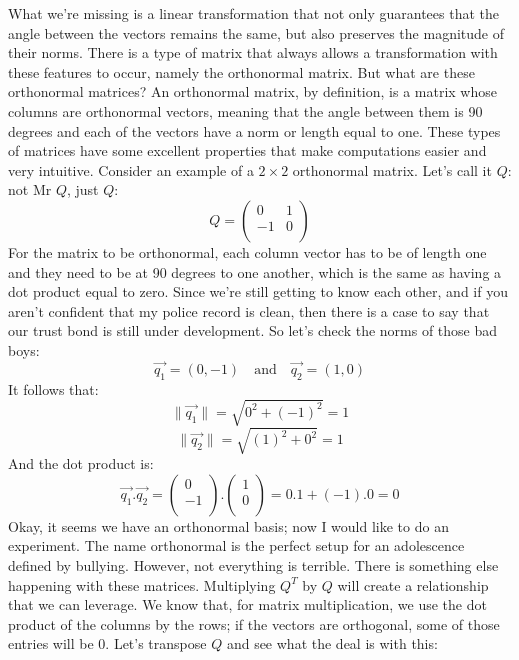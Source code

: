 \documentclass[600paper, 11pt,twoside,openany]{kdp}
\begin{document}
What we’re missing is a linear transformation that not only guarantees that the angle between the vectors remains the same, but also preserves the magnitude of their norms. There is a type of matrix that always allows a transformation with these features to occur, namely the orthonormal matrix. But what are these orthonormal matrices? An orthonormal matrix, by definition, is a matrix whose columns are orthonormal vectors, meaning that the angle between them is 90 degrees and each of the vectors have a norm or length equal to one. These types of matrices have some excellent properties that make computations easier and very intuitive. Consider an example of a $2 \times 2$ orthonormal matrix. Let’s call it $Q$: not Mr $Q$, just $Q$:
\[Q = \begin{pmatrix}
0 & 1 \\
-1 & 0 \\
\end{pmatrix}
\]
\indent For the matrix to be orthonormal, each column vector has to be of length one and they need to be at 90 degrees to one another, which is the same as having a dot product equal to zero. Since we’re still getting to know each other, and if you aren’t confident that my police record is clean, then there is a case to say that our trust bond is still under development. So let’s check the norms of those bad boys:
\[\overrightarrow{q_1} = (0, -1) \quad \textrm{and}  \quad\overrightarrow{q_2} = (1,0)\]
\indent It follows that: 
\[ \lVert \overrightarrow{q_1} \rVert = \sqrt{0^2 + (-1)^2} = 1\]
\[ \lVert \overrightarrow{q_2} \rVert = \sqrt{(1)^2 + 0^2}  = 1 \]
\indent And the dot product is:
\[\overrightarrow{q_1}.\overrightarrow{q_2} = \begin{pmatrix}
0 \\
-1\\
\end{pmatrix}.\begin{pmatrix}
1\\
0\\
\end{pmatrix} =0.1 + (-1).0 = 0 \]
\indent Okay, it seems we have an orthonormal basis; now I would like to do an experiment. The name orthonormal is the perfect setup for an adolescence defined by bullying. However, not everything is terrible. There is something else happening with these matrices. Multiplying $Q^T$ by $Q$ will create a relationship that we can leverage. We know that, for matrix multiplication, we use the dot product of the columns by the rows; if the vectors are orthogonal, some of those entries will be 0. Let’s transpose $Q$ and see what the deal is with this:
\end{document}
